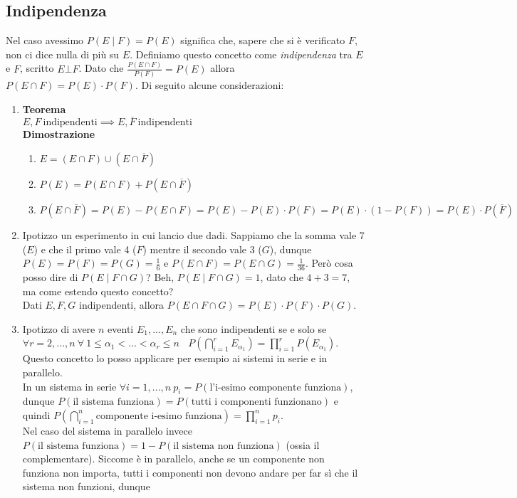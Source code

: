 \documentclass[11pt]{report}
\begin{document}
\subsection{Indipendenza}
Nel caso avessimo $P(E \mid F) = P(E)$ significa che, sapere che si è verificato $F$, non ci dice nulla di più su $E$. Definiamo questo concetto come \textit{indipendenza} tra $E$ e $F$, scritto $E \bot F$. Dato che $\frac{P(E \cap F)}{P(F)} = P(E)$ allora $P(E \cap F) = P(E) \cdot P(F)$. Di seguito alcune considerazioni:
\begin{enumerate}
	\item \textbf{Teorema}\\
	$E,F\ \text{indipendenti} \implies E,\overline{F}\ \text{indipendenti}$\\
	\textbf{Dimostrazione}
	\begin{enumerate}
		\item $E = (E \cap F) \cup (E \cap \overline{F})$
		\item $P(E) =  P(E \cap F) + P(E \cap \overline{F})$
		\item $P(E \cap \overline{F}) = P(E) - P(E \cap F) = P(E) - P(E) \cdot P(F) = P(E) \cdot (1 - P(F)) = P(E) \cdot P(\overline{F})$
	\end{enumerate}
	\item Ipotizzo un esperimento in cui lancio due dadi. Sappiamo che la somma vale 7 ($E$) e che il primo vale 4 ($F$) mentre il secondo vale 3 ($G$), dunque $P(E) = P(F) = P(G) = \frac{1}{6}$ e $P(E \cap F) = P(E \cap G) = \frac{1}{36}$. Però cosa posso dire di $P(E \mid F \cap G)$? Beh, $P(E \mid F \cap G) = 1$, dato che $4 + 3 = 7$, ma come estendo questo concetto?\\
	Dati $E,F,G$ indipendenti, allora $P(E \cap F \cap G) = P(E) \cdot P(F) \cdot P(G)$.
	\item Ipotizzo di avere $n$ eventi $E_1,...,E_n$ che sono indipendenti se e solo se $\forall r = 2,...,n\ \forall\ 1 \leq \alpha_1 < ... < \alpha_r \leq n\ \ \ \ P \left( \bigcap_{i=1}^{r}E_{\alpha_1} \right) = \prod_{i=1}^{r}P \left( E_{\alpha_1} \right)$. Questo concetto lo posso applicare per esempio ai sistemi in serie e in parallelo.\\
    In un sistema in serie $\forall i = 1,...,n\ p_i = P(\text{l'i-esimo componente funziona})$, dunque $P(\text{il sistema funziona}) = P(\text{tutti i componenti funzionano})$ e quindi $P\left(\bigcap_{i=1}^{n}\text{componente i-esimo funziona}\right) = \prod_{i=1}^{n}p_i$.\\
    Nel caso del sistema in parallelo invece $P(\text{il sistema funziona}) = 1 - P(\text{il sistema non funziona})$ (ossia il complementare). Siccome è in parallelo, anche se un componente non funziona non importa, tutti i componenti non devono andare per far sì che il sistema non funzioni, dunque

\end{enumerate}
\end{document}
